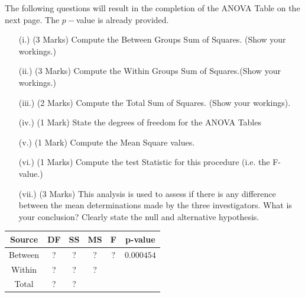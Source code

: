 \documentclass[a4paper,12pt]{article}
\begin{document}
	\noindent The following questions will result in the completion of the ANOVA Table on the next page. The $p-$value is already provided.
	\begin{itemize}
		\item[(i.)](3 Marks) Compute the Between Groups Sum of Squares. (Show your workings.)
		\item[(ii.)](3 Marks) Compute the Within Groups Sum of Squares.(Show your workings.)
		\item[(iii.)](2 Marks) Compute the Total Sum of Squares. (Show your workings).
		\item[(iv.)] (1 Mark) State the degrees of freedom for the ANOVA Tables
		\item[(v.)] (1 Mark) Compute the Mean Square values.
		\item[(vi.)] (1 Marks) Compute the test Statistic for this procedure (i.e. the F-value.)
		\item[(vii.)] (3 Marks) This analysis is used to assess if there is any difference between the mean determinations made by the three investigators. What is your conclusion? Clearly state the null and alternative hypothesis.
	\end{itemize}
	\begin{center}
		\begin{tabular}{|c||c|c|c|c|c|}
			\hline Source & DF & SS & MS & F & p-value \\ \hline 
			\hline Between & \phantom{mak} ? \phantom{mak}  & \phantom{mak} ? \phantom{mak}  & \phantom{mak} ? \phantom{mak}  & \phantom{mak} ? \phantom{mak}  &  $0.000454$ \\ 
			\hline Within &  ? & ? & \phantom{mak} ? \phantom{mak}  &  &  \\ 
			\hline \hline Total & ? & ? &  &  &  \\ 
			\hline 
		\end{tabular}
	\end{center} 
	\newpage
\end{document}
